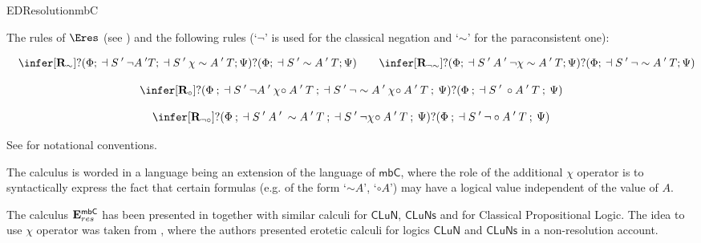 \begin{entry}{EDResolutionmbC}  




\begin{calculus}

The rules of $\Eres$ (see ) and the following rules (`$\lnot$' is used for the classical negation and `$\sim$' for the paraconsistent one):

\vspace{-0.3cm}

$$
\quad
\infer[\textbf{R}_{\sim }]
{?(\Phi;\:\dashv S\:'\:\neg A\:' T;\:\dashv S\:'\:\chi\sim A\:'\:T;\Psi)}
{?(\Phi;\:\dashv S\:' \sim A\:'\:T;\Psi)}
\qquad
\infer[\textbf{R}_{\neg\sim}]
{?(\Phi;\:\dashv S\:'\:A\:'\:\neg\chi\sim A\:'\:T;\Psi)}
{?(\Phi;\:\dashv S\:'\:\neg\sim A\:'\:T;\Psi)}$$

\vspace{-0.5cm}

$$\infer[\textbf{R}_{\circ}]
{?(\Phi\:;\:\dashv S\:'\:\neg A\:'\:\chi\!\circ A\:'\:T\:;\:\dashv S\:'\:\neg\sim A\:'\:\chi\!\circ A\:'\:T\:;\:\Psi)}
{?(\Phi\:;\:\dashv S\:'\:\circ A\:'\:T\:;\:\Psi)}$$

\vspace{-0.3cm}

$$\infer[\textbf{R}_{\neg\circ}]
{?(\Phi\:;\:\dashv S\:'\:A\:'\:\sim A\:'\:T\:;\:\dashv S\:'\:\neg\chi\!\circ A\:'\:T\:;\:\Psi)}
{?(\Phi\:;\:\dashv S\:'\:\neg\circ A\:'\:T\:;\:\Psi)}$$
\end{calculus}



\begin{clarifications}
See  for notational conventions.

The calculus is worded in a language being an extension of the language of $\mathsf{mbC}$, where the role of the additional $\chi$ operator is to syntactically express the fact that certain formulas (e.g. of the form `$\sim A$', `$\circ A$') may have a logical value independent of the value of $A$.
\end{clarifications}

\begin{history}
The calculus $\mathbf{E}^\mathsf{mbC}_{res}$ has been presented in \cite{SzChDLJ:LFI} together with similar calculi for $\mathsf{CLuN}$, $\mathsf{CLuNs}$ and for Classical Propositional Logic. The idea to use $\chi$ operator was taken from \cite{WVL:2005}, where the authors presented erotetic calculi for logics $\mathsf{CLuN}$ and $\mathsf{CLuNs}$ in a non-resolution account.
\end{history}


\end{entry}
